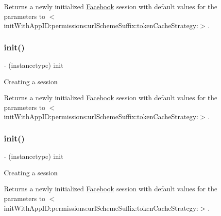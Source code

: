 Returns a newly initialized \hyperlink{interfaceFacebook}{Facebook} session with default values for the parameters to $<$init\+With\+App\+I\+D\+:permissions\+:url\+Scheme\+Suffix\+:token\+Cache\+Strategy\+:$>$. \mbox{\label{interfaceFBSession_ac5ec026f515c232cd4498cf2bc4022b4}} 
\subsubsection{\texorpdfstring{init()}{init()}\hspace{0.1cm}{\footnotesize\ttfamily [4/5]}}
{\footnotesize\ttfamily -\/ (instancetype) init \begin{DoxyParamCaption}{ }\end{DoxyParamCaption}}

Creating a session

Returns a newly initialized \hyperlink{interfaceFacebook}{Facebook} session with default values for the parameters to $<$init\+With\+App\+I\+D\+:permissions\+:url\+Scheme\+Suffix\+:token\+Cache\+Strategy\+:$>$. \mbox{\label{interfaceFBSession_ac5ec026f515c232cd4498cf2bc4022b4}} 
\subsubsection{\texorpdfstring{init()}{init()}\hspace{0.1cm}{\footnotesize\ttfamily [5/5]}}
{\footnotesize\ttfamily -\/ (instancetype) init \begin{DoxyParamCaption}{ }\end{DoxyParamCaption}}

Creating a session

Returns a newly initialized \hyperlink{interfaceFacebook}{Facebook} session with default values for the parameters to $<$init\+With\+App\+I\+D\+:permissions\+:url\+Scheme\+Suffix\+:token\+Cache\+Strategy\+:$>$. \mbox{\label{interfaceFBSession_a7f878c2e85b4f400378bf0c00314e7c3}} 
